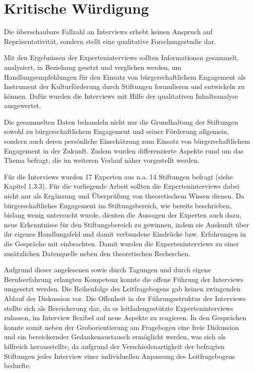 \section{Kritische Würdigung}

Die überschaubare Fallzahl an Interviews erhebt keinen Anspruch auf Repräsentativität, sondern stellt eine qualitative Forschungsstudie dar. 

Mit den Ergebnissen der Experteninterviews sollten Informationen gesammelt, analysiert, in Beziehung gesetzt und verglichen werden, um Handlungsempfehlungen für den Einsatz von bürgerschaftlichem Engagement als Instrument der Kulturförderung durch Stiftungen formulieren und entwickeln zu können. Dafür wurden die Interviews mit Hilfe der qualitativen Inhaltsanalyse ausgewertet.

Die gesammelten Daten behandeln nicht nur die Grundhaltung der Stiftungen sowohl zu bürgerschaftlichem Engagement und seiner Förderung allgemein, sondern auch deren persönliche Einschätzung zum Einsatz von bürgerschaftlichem Engagement in der Zukunft. Zudem wurden differenzierte Aspekte rund um das Thema befragt, die im weiteren Verlauf näher vorgestellt werden.

Für die Interviews wurden 17 Experten aus u.a. 14 Stiftungen befragt (siehe Kapitel 1.3.3). Für die vorliegende Arbeit sollten die Experteninterviews dabei nicht nur als Ergänzung und Überprüfung von theoretischem Wissen dienen. Da bürgerschaftliches Engagement im Stiftungsbereich, wie bereits beschrieben, bislang wenig untersucht wurde, dienten die Aussagen der Experten auch dazu, neue Erkenntnisse für den Stiftungsbereich zu gewinnen, indem sie Auskunft über ihr eigenes Handlungsfeld und damit verbundene Eindrücke bzw. Erfahrungen in die Gespräche mit einbrachten. Damit wurden die Experteninterviews zu einer zusätzlichen Datenquelle neben den theoretischen Recherchen.

Aufgrund dieser angelesenen sowie durch Tagungen und durch eigene Berufserfahrung erlangten Kompetenz konnte die offene Führung der Interviews umgesetzt werden. Die Reihenfolge des Leitfragebogens gab keinen zwingenden Ablauf der Diskussion vor. Die Offenheit in der Führungsstruktur der Interviews stellte sich als Bereicherung dar, da es leitfadengestützte Experteninterviews zulassen, im Interview flexibel auf neue Aspekte zu reagieren. In den Gesprächen konnte somit neben der Groborientierung am Fragebogen eine freie Diskussion und ein bereichernder Gedankenaustausch ermöglicht werden, was sich als hilfreich herausstellte, da aufgrund der Verschiedenartigkeit der befragten Stiftungen jedes Interview einer individuellen Anpassung des Leitfragebogens bedurfte.

